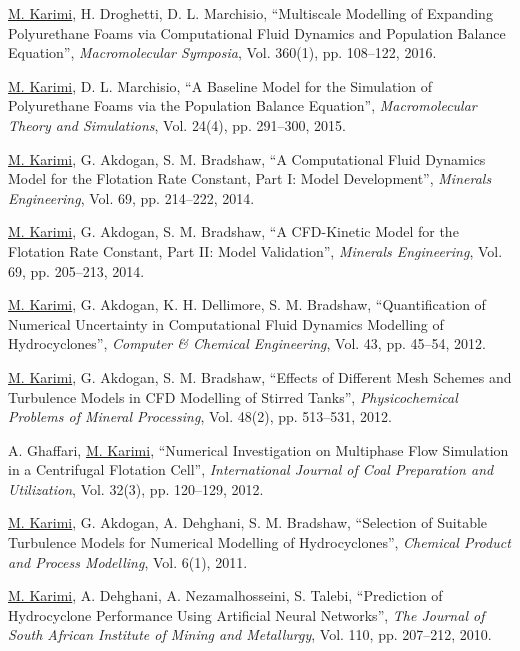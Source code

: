 \documentclass[10pt,a4]{article}
\newcounter{myEnumCounter}
\newcounter{mySaveCounter}
\renewenvironment{enumerate}{%
  \begin{list}{\arabic{myEnumCounter}.}{\usecounter{myEnumCounter}%
  \setcounter{myEnumCounter}{\value{mySaveCounter}}}
  }{%
  \setcounter{mySaveCounter}{\value{myEnumCounter}}\end{list}%
}
\newcommand{\quotes}[1]{``#1''}
\begin{document}
\begin{small}
\begin{enumerate}
    \item
\underline{M. Karimi}, H. Droghetti, D. L. Marchisio, \quotes{Multiscale Modelling of Expanding Polyurethane Foams via Computational Fluid Dynamics and Population Balance Equation},  \textit{Macromolecular Symposia}, Vol. 360(1), pp. 108--122, 2016.

	\item
\underline{M. Karimi}, D. L. Marchisio, \quotes{A Baseline Model for the Simulation of Polyurethane Foams via the Population Balance Equation}, \textit{Macromolecular Theory and Simulations}, Vol. 24(4), pp. 291--300, 2015.
	
	\item
\underline{M. Karimi}, G. Akdogan, S. M. Bradshaw, \quotes{A Computational Fluid Dynamics Model for the Flotation Rate Constant, Part I: Model Development}, \textit{Minerals Engineering}, Vol. 69, pp. 214--222, 2014.

	\item
\underline{M. Karimi}, G. Akdogan, S. M. Bradshaw, \quotes{A CFD-Kinetic Model for the Flotation Rate Constant, Part II: Model Validation}, \textit{Minerals Engineering}, Vol. 69, pp. 205--213, 2014.
	
	\item
\underline{M. Karimi}, G. Akdogan, K. H. Dellimore, S. M. Bradshaw, \quotes{Quantification of Numerical Uncertainty in Computational Fluid Dynamics Modelling of Hydrocyclones}, \textit{Computer \& Chemical Engineering}, Vol. 43, pp. 45--54, 2012. 

	\item 
\underline{M. Karimi}, G. Akdogan, S. M. Bradshaw, \quotes{Effects of Different Mesh Schemes and Turbulence Models in CFD Modelling of Stirred Tanks}, \textit{Physicochemical Problems of Mineral Processing}, Vol. 48(2), pp. 513--531, 2012.

	\item
A. Ghaffari, \underline{M. Karimi}, \quotes{Numerical Investigation on Multiphase Flow Simulation in a Centrifugal Flotation Cell}, \textit{International Journal of Coal Preparation and Utilization}, Vol. 32(3), pp. 120--129, 2012.

	\item 
\underline{M. Karimi}, G. Akdogan, A. Dehghani, S. M. Bradshaw, \quotes{Selection of Suitable Turbulence Models for Numerical Modelling of Hydrocyclones}, \textit{Chemical Product and Process Modelling}, Vol. 6(1), 2011.

	\item
\underline{M. Karimi}, A. Dehghani, A. Nezamalhosseini, S. Talebi, \quotes{Prediction of Hydrocyclone Performance Using Artificial Neural Networks}, \textit{The Journal of South African Institute of Mining and Metallurgy}, Vol. 110, pp. 207--212, 2010.


\end{enumerate}
\end{small}
\end{document}
